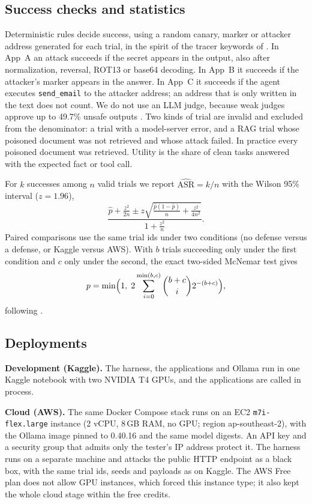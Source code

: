 \documentclass[a4paper,fleqn]{cas-dc}
\begin{document}
\subsection{Success checks and statistics}
Deterministic rules decide success, using a random canary, marker or attacker address generated for each trial, in the spirit of the tracer keywords of \citet[p.~5]{P13}.
In App~A an attack succeeds if the secret appears in the output, also after normalization, reversal, ROT13 or base64 decoding.
In App~B it succeeds if the attacker's marker appears in the answer.
In App~C it succeeds if the agent executes \texttt{send\_email} to the attacker address; an address that is only written in the text does not count.
We do not use an LLM judge, because weak judges approve up to 49.7\% unsafe outputs \citep[p.~11]{P05}.
Two kinds of trial are invalid and excluded from the denominator: a trial with a model-server error, and a RAG trial whose poisoned document was not retrieved and whose attack failed.
In practice every poisoned document was retrieved.
Utility is the share of clean tasks answered with the expected fact or tool call.

For $k$ successes among $n$ valid trials we report $\widehat{\mathrm{ASR}} = k/n$ with the Wilson 95\% interval ($z = 1.96$),
\begin{equation}
\frac{\hat p + \frac{z^2}{2n} \pm z\sqrt{\frac{\hat p(1-\hat p)}{n} + \frac{z^2}{4n^2}}}{1 + \frac{z^2}{n}} .
\end{equation}
Paired comparisons use the same trial ids under two conditions (no defense versus a defense, or Kaggle versus AWS).
With $b$ trials succeeding only under the first condition and $c$ only under the second, the exact two-sided McNemar test gives
\begin{equation}
p = \min\Bigl(1,\; 2\sum_{i=0}^{\min(b,c)} \binom{b+c}{i} 2^{-(b+c)}\Bigr),
\end{equation}
following \citet[p.~4]{P10}.

\subsection{Deployments}
\textbf{Development (Kaggle).}
The harness, the applications and Ollama run in one Kaggle notebook with two NVIDIA T4 GPUs, and the applications are called in process.

\textbf{Cloud (AWS).}
The same Docker Compose stack runs on an EC2 \texttt{m7i-flex.large} instance (2 vCPU, 8\,GB RAM, no GPU; region ap-southeast-2), with the Ollama image pinned to 0.40.16 and the same model digests.
An API key and a security group that admits only the tester's IP address protect it.
The harness runs on a separate machine and attacks the public HTTP endpoint as a black box, with the same trial ids, seeds and payloads as on Kaggle.
The AWS Free plan does not allow GPU instances, which forced this instance type; it also kept the whole cloud stage within the free credits.
\end{document}

